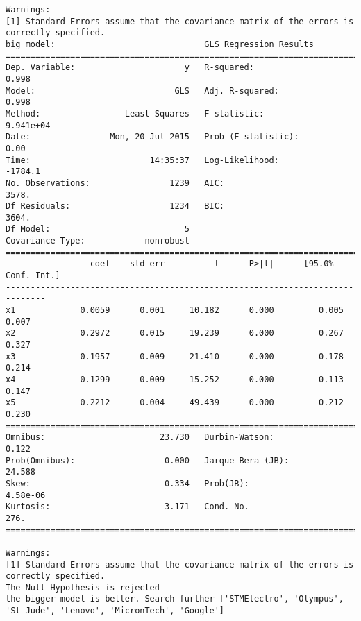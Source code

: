 \documentclass{article}
\begin{document}
\begin{verbatim}
Warnings:
[1] Standard Errors assume that the covariance matrix of the errors is correctly specified.
big model:                              GLS Regression Results                            
==============================================================================
Dep. Variable:                      y   R-squared:                       0.998
Model:                            GLS   Adj. R-squared:                  0.998
Method:                 Least Squares   F-statistic:                 9.941e+04
Date:                Mon, 20 Jul 2015   Prob (F-statistic):               0.00
Time:                        14:35:37   Log-Likelihood:                -1784.1
No. Observations:                1239   AIC:                             3578.
Df Residuals:                    1234   BIC:                             3604.
Df Model:                           5                                         
Covariance Type:            nonrobust                                         
==============================================================================
                 coef    std err          t      P>|t|      [95.0% Conf. Int.]
------------------------------------------------------------------------------
x1             0.0059      0.001     10.182      0.000         0.005     0.007
x2             0.2972      0.015     19.239      0.000         0.267     0.327
x3             0.1957      0.009     21.410      0.000         0.178     0.214
x4             0.1299      0.009     15.252      0.000         0.113     0.147
x5             0.2212      0.004     49.439      0.000         0.212     0.230
==============================================================================
Omnibus:                       23.730   Durbin-Watson:                   0.122
Prob(Omnibus):                  0.000   Jarque-Bera (JB):               24.588
Skew:                           0.334   Prob(JB):                     4.58e-06
Kurtosis:                       3.171   Cond. No.                         276.
==============================================================================

Warnings:
[1] Standard Errors assume that the covariance matrix of the errors is correctly specified.
The Null-Hypothesis is rejected
the bigger model is better. Search further ['STMElectro', 'Olympus', 'St Jude', 'Lenovo', 'MicronTech', 'Google']


\end{verbatim}
\end{document}
